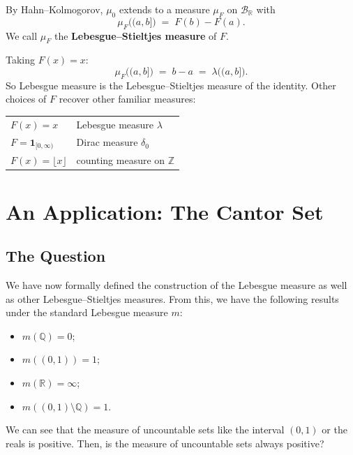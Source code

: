 \documentclass[11pt]{article}
\theoremstyle{definition}
\theoremstyle{plain}
\newcommand{\R}{\mathbb{R}}
\newcommand{\Q}{\mathbb{Q}}
\newcommand{\Z}{\mathbb{Z}}
\newcommand{\B}{\mathcal{B}}
\begin{document}
By Hahn--Kolmogorov, $\mu_0$ extends to a measure $\mu_F$ on $\B_{\R}$
with
\[
  \mu_F\big((a,b]\big) \;=\; F(b) - F(a).
\]
We call $\mu_F$ the \textbf{Lebesgue--Stieltjes measure} of $F$.

Taking $F(x) = x$:
\[
  \mu_F\big((a,b]\big) \;=\; b - a \;=\; \lambda\big((a,b]\big).
\]
So Lebesgue measure is the Lebesgue--Stieltjes measure of the identity.
Other choices of $F$ recover other familiar measures:

\begin{center}
\begin{tabular}{ll}
  $F(x) = x$ & Lebesgue measure $\lambda$ \\[2pt]
  $F = \mathbf{1}_{[0,\infty)}$ & Dirac measure $\delta_0$ \\[2pt]
  $F(x) = \lfloor x \rfloor$ & counting measure on $\Z$
\end{tabular}
\end{center}

\section{An Application: The Cantor Set}

\subsection{The Question}

We have now formally defined the construction of the Lebesgue measure
as well as other Lebesgue--Stieltjes measures. From this, we have the
following results under the standard Lebesgue measure $m$:
\begin{itemize}
  \item $m(\Q) = 0$;
  \item $m((0,1)) = 1$;
  \item $m(\R) = \infty$;
  \item $m((0,1) \setminus \Q) = 1$.
\end{itemize}

We can see that the measure of uncountable sets like the interval
$(0,1)$ or the reals is positive. Then, is the measure of uncountable
sets always positive?

\end{document}
